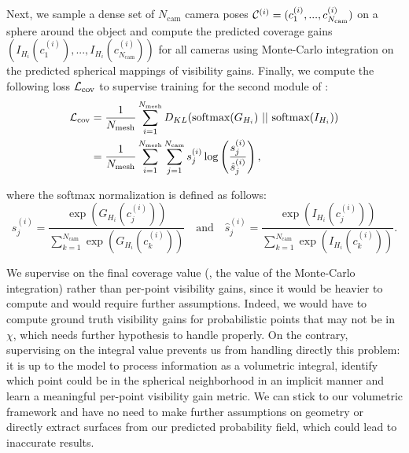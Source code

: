 {Next, we sample a dense set of $N_{\text{cam}}$ camera poses ${\cal C}^{(i)} = (c_1^{(i)}, ..., c_{N_{\text{cam}}}^{(i)})$ on a sphere around the object and compute the predicted coverage gains $(I_{H_i}(c_1^{(i)}), ..., I_{H_i}(c_{N_{\text{cam}}}^{(i)}))$ for all cameras using Monte-Carlo integration on the predicted spherical mappings of visibility gains. Finally, we compute the following loss ${\cal L}_{\text{cov}}$ to supervise training for the second module of \method:
%
\begin{equation}
    \begin{split}
        \calL_{\text{cov}} & = \frac{1}{N_{\text{mesh}}} \sum_{i=1}^{N_{\text{mesh}}} D_{KL}(\softmax(G_{H_i})\ ||\ \softmax(I_{H_i}))\\
        & = \frac{1}{N_{\text{mesh}}} \sum_{i=1}^{N_{\text{mesh}}} 
        \sum_{j=1}^{N_{\text{cam}}} 
        s_j^{(i)} \log\left( \frac{s_j^{(i)}}{\hat{s}_j^{(i)}} \right)
        ,
    \end{split}
\end{equation}

where the softmax normalization is defined as follows:
%
$$s_j^{(i)} = \frac{\exp\left(G_{H_i}(c_j^{(i)})\right)}{\sum_{k=1}^{N_{\text{cam}}}\exp\left(G_{H_i}(c_k^{(i)})\right)} \quad \text{and} \quad \hat{s}_j^{(i)} = \frac{\exp\left(I_{H_i}(c_j^{(i)})\right)}{\sum_{k=1}^{N_{\text{cam}}}\exp\left(I_{H_i}(c_k^{(i)})\right)}.$$
%

We supervise on the final coverage value (\ie, the value of the Monte-Carlo integration) rather than per-point visibility gains, since it would be heavier to compute and would require further assumptions. Indeed, we would have to compute ground truth visibility gains for probabilistic points that may not be in $\chi$, which needs further hypothesis to handle properly. On the contrary, supervising on the integral value prevents us from handling directly this problem: it is up to the model to process information as a volumetric integral, identify which point could be in the spherical neighborhood in an implicit manner and learn a meaningful per-point visibility gain metric. We can stick to our volumetric framework and have no need to make further assumptions on geometry or directly extract surfaces from our predicted probability field, which could lead to inaccurate results.%

}
